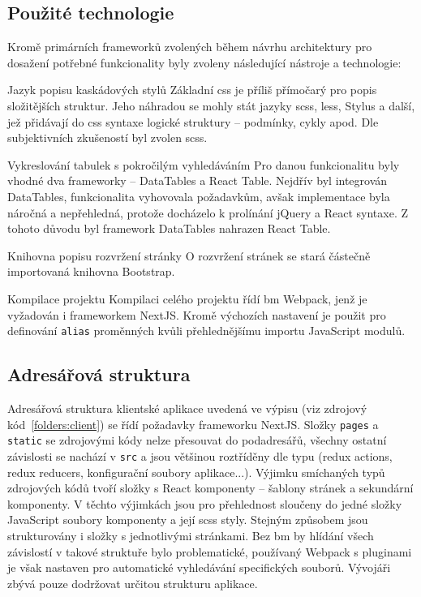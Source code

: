 \subsection{Použité technologie}

Kromě primárních frameworků zvolených během návrhu architektury pro dosažení potřebné funkcionality byly zvoleny následující nástroje a technologie:

\begin{dl}
   \item [Jazyk popisu kaskádových stylů] Základní \gls{css} je příliš přímočarý pro popis složitějších struktur. Jeho náhradou se mohly stát jazyky \gls{scss}, \gls{less}, Stylus a další, jež přidávají do \gls{css} syntaxe logické struktury -- podmínky, cykly apod. Dle subjektivních zkušeností byl zvolen \gls{scss}.
   
   \item [Vykreslování tabulek s pokročilým vyhledáváním] Pro danou funkcionalitu byly vhodné dva frameworky -- DataTables a React Table. Nejdřív byl integrován DataTables, funkcionalita vyhovovala požadavkům, avšak implementace byla náročná a nepřehledná, protože docházelo k prolínání jQuery a React syntaxe. Z tohoto důvodu byl framework DataTables nahrazen React Table.
   
   \item [Knihovna popisu rozvržení stránky] O rozvržení stránek se stará částečně importovaná knihovna Bootstrap.
   
   \item [Kompilace projektu] Kompilaci celého projektu řídí \gls{bm} Webpack, jenž je vyžadován i frameworkem NextJS. Kromě výchozích nastavení je použit pro definování \texttt{alias} proměnných kvůli přehlednějšímu importu JavaScript modulů.
\end{dl}



\subsection{Adresářová struktura}

Adresářová struktura klientské aplikace uvedená ve výpisu (viz zdrojový kód~\ref{folders:client}) se řídí požadavky frameworku \mbox{NextJS}. Složky \texttt{pages} a \texttt{static} se zdrojovými kódy nelze přesouvat do podadresářů, všechny ostatní závislosti se nachází v \texttt{src} a jsou většinou roztříděny dle typu (redux actions, redux reducers, konfigurační soubory aplikace...). Výjimku smíchaných typů zdrojových kódů tvoří složky s React komponenty -- šablony stránek a sekundární komponenty. V těchto výjimkách jsou pro přehlednost sloučeny do jedné složky JavaScript soubory komponenty a její \gls{scss} styly. Stejným způsobem jsou strukturovány i složky s jednotlivými stránkami. Bez \gls{bm} by hlídání všech závislostí v takové struktuře bylo problematické, používaný Webpack s pluginami je však nastaven pro automatické vyhledávání specifických souborů. Vývojáři zbývá pouze dodržovat určitou strukturu aplikace.

